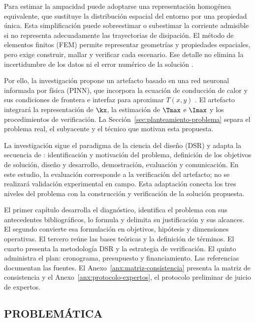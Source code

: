 Para estimar la ampacidad puede adoptarse una representación homogénea equivalente, que sustituye la distribución espacial del entorno por una propiedad única. Esta simplificación puede sobreestimar o subestimar la corriente admisible si no representa adecuadamente las trayectorias de disipación. El método de elementos finitos (FEM) permite representar geometrías y propiedades espaciales, pero exige construir, mallar y verificar cada escenario. Ese detalle no elimina la incertidumbre de los datos ni el error numérico de la solución \parencites[41--42,93--99]{cigre2025}[1--3,12]{aldulaimi2024}.

Por ello, la investigación propone un artefacto basado en una red neuronal informada por física (PINN), que incorpora la ecuación de conducción de calor y sus condiciones de frontera e interfaz para aproximar \(T(x,y)\) \parencite{raissi2019}. El artefacto integrará la representación de \(\kx\), la estimación de \(\Tmax\) e \(\Imax\) y los procedimientos de verificación. La Sección~\ref{sec:planteamiento-problema} separa el problema real, el subyacente y el técnico que motivan esta propuesta.

La investigación sigue el paradigma de la ciencia del diseño (DSR) y adapta la secuencia de \textcite[54--56]{peffers2007}: identificación y motivación del problema, definición de los objetivos de solución, diseño y desarrollo, demostración, evaluación y comunicación. En este estudio, la evaluación corresponde a la verificación del artefacto; no se realizará validación experimental en campo. Esta adaptación conecta los tres niveles del problema con la construcción y verificación de la solución propuesta.

El primer capítulo desarrolla el diagnóstico, identifica el problema con sus antecedentes bibliográficos, lo formula y delimita su justificación y sus alcances. El segundo convierte esa formulación en objetivos, hipótesis y dimensiones operativas. El tercero reúne las bases teóricas y la definición de términos. El cuarto presenta la metodología DSR y la estrategia de verificación. El quinto administra el plan: cronograma, presupuesto y financiamiento. Las referencias documentan las fuentes. El Anexo~\ref{anx:matriz-consistencia} presenta la matriz de consistencia y el Anexo~\ref{anx:protocolo-expertos}, el protocolo preliminar de juicio de expertos.

\subsection{PROBLEMÁTICA}

